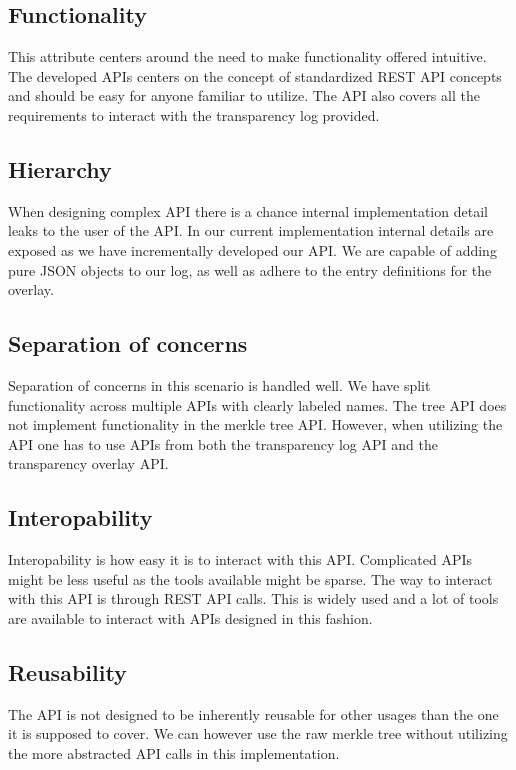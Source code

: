 \documentclass[../Main/thesis.tex]{subfiles}
\begin{document}
\subsection*{Functionality}%
\label{sub:functionality}
This attribute centers around the need to make functionality offered intuitive.
The developed APIs centers on the concept of standardized REST API concepts and
should be easy for anyone familiar to utilize. The API also covers all the
requirements to interact with the transparency log provided.

\subsection*{Hierarchy}%
\label{sub:hierarchy}
When designing complex API there is a chance internal implementation detail
leaks to the user of the API. In our current implementation internal details are
exposed as we have incrementally developed our API. We are capable of adding
pure JSON objects to our log, as well as adhere to the entry definitions for the
overlay.

\subsection*{Separation of concerns}%
\label{sub:seperation_of_concerns}
Separation of concerns in this scenario is handled well. We have split
functionality across multiple APIs with clearly labeled names. The tree API does
not implement functionality in the merkle tree API. However, when utilizing the
API one has to use APIs from both the transparency log API and the transparency
overlay API.

\subsection*{Interopability}%
\label{sub:interopability}
Interopability is how easy it is to interact with this API. Complicated APIs
might be less useful as the tools available might be sparse.  The way to
interact with this API is through REST API calls. This is widely used and a lot
of tools are available to interact with APIs designed in this fashion.

\subsection*{Reusability}%
\label{sub:reusability}
The API is not designed to be inherently reusable for other usages than the one
it is supposed to cover. We can however use the raw merkle tree without
utilizing the more abstracted API calls in this implementation.
\end{document}
